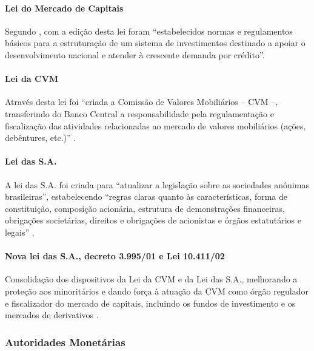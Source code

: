 \documentclass[]{article}
\let\oldparagraph\paragraph
\renewcommand{\paragraph}[1]{\oldparagraph{#1}\mbox{}}
\begin{document}
\paragraph{Lei do Mercado de Capitais}\label{lei-do-mercado-de-capitais}

Segundo , com a edição desta lei foram
``estabelecidos normas e regulamentos básicos para a estruturação de um
sistema de investimentos destinado a apoiar o desenvolvimento nacional e
atender à crescente demanda por crédito''.

\paragraph{Lei da CVM}\label{lei-da-cvm}

Através desta lei foi ``criada a Comissão de Valores Mobiliários -- CVM
--, transferindo do Banco Central a responsabilidade pela regulamentação
e fiscalização das atividades relacionadas ao mercado de valores
mobiliários (ações, debêntures, etc.)'' \cite[p.16]{fortuna2015}.

\paragraph{Lei das S.A.}\label{lei-das-s.a.}

A lei das S.A. foi criada para ``atualizar a legislação sobre as
sociedades anônimas brasileiras'', estabelecendo ``regras claras quanto
às características, forma de constituição, composição acionária,
estrutura de demonstrações financeiras, obrigações societárias, direitos
e obrigações de acionistas e órgãos estatutários e legais''
\cite[p.~16]{fortuna2015}.

\paragraph{Nova lei das S.A., decreto 3.995/01 e Lei
10.411/02}\label{nova-lei-das-s.a.-decreto-3.99501-e-lei-10.41102}

Consolidação dos dispositivos da Lei da CVM e da Lei das S.A.,
melhorando a proteção aos minoritários e dando força à atuação da CVM
como órgão regulador e fiscalizador do mercado de capitais, incluindo os
fundos de investimento e os mercados de derivativos
\cite[p.~14]{beatrizselan}.

\subsubsection{Autoridades Monetárias}\label{subsec:aut_mon}
\end{document}
